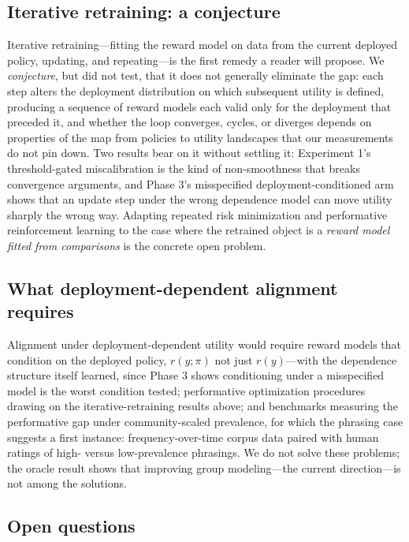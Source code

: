 ﻿\documentclass[11pt]{article}
\begin{document}
\subsection{Iterative retraining: a conjecture}
\label{sec:iterative}

Iterative retraining---fitting the reward model on data from the current deployed policy, updating, and repeating---is the first remedy a reader will propose. We \emph{conjecture}, but did not test, that it does not generally eliminate the gap: each step alters the deployment distribution on which subsequent utility is defined, producing a sequence of reward models each valid only for the deployment that preceded it, and whether the loop converges, cycles, or diverges depends on properties of the map from policies to utility landscapes that our measurements do not pin down. Two results bear on it without settling it: Experiment 1's threshold-gated miscalibration is the kind of non-smoothness that breaks convergence arguments, and Phase 3's misspecified deployment-conditioned arm shows that an update step under the wrong dependence model can move utility sharply the wrong way. Adapting repeated risk minimization \citep{perdomo2020, mendler2020} and performative reinforcement learning \citep{mandal2023} to the case where the retrained object is a \emph{reward model fitted from comparisons} is the concrete open problem.

\subsection{What deployment-dependent alignment requires}
\label{sec:requires}

Alignment under deployment-dependent utility would require reward models that condition on the deployed policy, \(r(y; \pi)\) not just \(r(y)\)---with the dependence structure itself learned, since Phase 3 shows conditioning under a misspecified model is the worst condition tested; performative optimization procedures drawing on the iterative-retraining results above; and benchmarks measuring the performative gap under community-scaled prevalence, for which the phrasing case suggests a first instance: frequency-over-time corpus data paired with human ratings of high- versus low-prevalence phrasings. We do not solve these problems; the oracle result shows that improving group modeling---the current direction---is not among the solutions.

\subsection{Open questions}
\label{sec:open}
\end{document}
